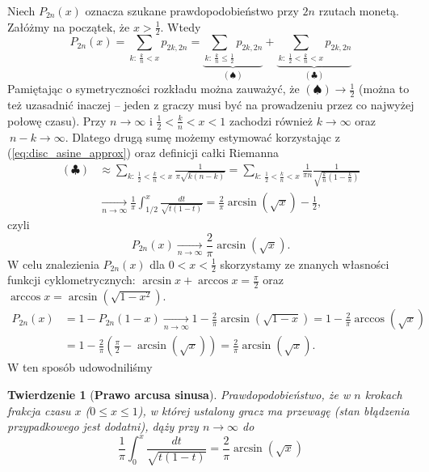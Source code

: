 \documentclass[a4paper,11pt,twoside]{book}
\newcommand{\conv}{\rightarrow}
\newcommand{\Conv}{\longrightarrow}
\newtheorem{twier}{Twierdzenie}[chapter]
\theoremstyle{definition}
\begin{document}
Niech $P_{2n}(x)$ oznacza szukane prawdopodobieństwo przy $2n$ rzutach monetą. Załóżmy na początek, że $x > \frac{1}{2}$. Wtedy
\[ P_{2n}(x) = \sum_{k:\ \frac{k}{n} < x} p_{2k,2n} = \underbrace{\sum_{k:\ \frac{k}{n} \leq \frac{1}{2}} p_{2k,2n}}_{(\spadesuit)} + \underbrace{\sum_{k:\ \frac{1}{2} < \frac{k}{n} < x} p_{2k,2n}}_{(\clubsuit)}  \]
Pamiętając o symetryczności rozkładu można zauważyć, że $(\spadesuit) \Conv \frac{1}{2}$ (można to też uzasadnić inaczej -- jeden z graczy musi być na prowadzeniu przez co najwyżej połowę czasu). Przy $n \conv \infty$ i $\frac{1}{2} < \frac{k}{n} < x < 1$ zachodzi również $k \Conv \infty$ oraz $\ n-k \Conv \infty$. Dlatego drugą sumę możemy estymować korzystając z (\ref{eq:disc_asine_approx}) oraz definicji całki Riemanna
\begin{equation*}
 \begin{split}
 (\clubsuit) &\approx \sum_{k:\ \frac{1}{2} < \frac{k}{n} < x} \frac{1}{\pi \sqrt{k(n-k)}} =  \sum_{k:\ \frac{1}{2} < \frac{k}{n} < x} \frac{1}{\pi n} \frac{1}{ \sqrt{\frac{k}{n} (1 - \frac{k}{n})} } \\
 &\xrightarrow[n \conv \infty]{} \frac{1}{\pi} \int_{1/2}^x \frac{dt}{\sqrt{t(1-t)}} = \frac{2}{\pi}\arcsin(\sqrt{x}) - \frac{1}{2},
 \end{split}
\end{equation*}
czyli
\[  P_{2n}(x) \xrightarrow[n \conv \infty]{} \frac{2}{\pi}\arcsin(\sqrt{x}). \]
W celu znalezienia $P_{2n}(x)$ dla $0 < x < \frac{1}{2}$ skorzystamy ze znanych własności funkcji cyklometrycznych: $\arcsin x + \arccos x = \frac{\pi}{2}$ oraz $\arccos x = \arcsin(\sqrt{1-x^2})$.
\begin{equation*}
 \begin{split}
  P_{2n}(x) &= 1 - P_{2n}(1-x) \xrightarrow[n \conv \infty]{} 1 - \frac{2}{\pi} \arcsin(\sqrt{1-x}) = 1 - \frac{2}{\pi} \arccos(\sqrt{x}) \\
  &= 1 - \frac{2}{\pi} \left( \frac{\pi}{2} - \arcsin(\sqrt{x}) \right) = \frac{2}{\pi}\arcsin(\sqrt{x}).
 \end{split}
\end{equation*}
W ten sposób udowodniliśmy
\begin{twier}[\textbf{Prawo arcusa sinusa}]
 Prawdopodobieństwo, że w $n$ krokach frakcja czasu $x$ ($0 \leq x \leq 1$), w której ustalony gracz ma przewagę (stan błądzenia przypadkowego jest dodatni), dąży przy $n \Conv \infty$ do
 \[  \frac{1}{\pi} \int_0^x \frac{dt}{\sqrt{t(1-t)}} = \frac{2}{\pi}\arcsin(\sqrt{x}) \]
\end{twier}
\end{document}
